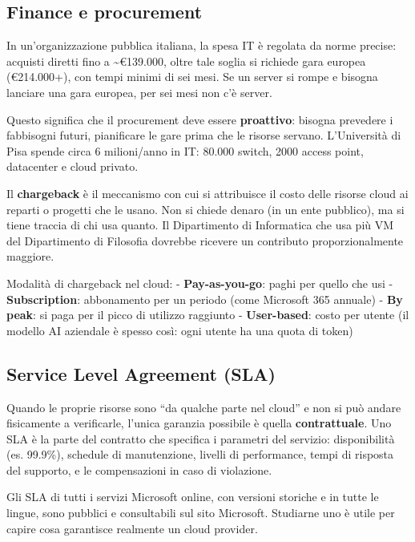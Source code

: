 \documentclass[
  italian,
  openany]{book}
\begin{document}
\subsection{Finance e procurement}\label{finance-e-procurement}

In un'organizzazione pubblica italiana, la spesa IT è regolata da norme
precise: acquisti diretti fino a \textasciitilde€139.000, oltre tale
soglia si richiede gara europea (€214.000+), con tempi minimi di sei
mesi. Se un server si rompe e bisogna lanciare una gara europea, per sei
mesi non c'è server.

Questo significa che il procurement deve essere \textbf{proattivo}:
bisogna prevedere i fabbisogni futuri, pianificare le gare prima che le
risorse servano. L'Università di Pisa spende circa 6 milioni/anno in IT:
80.000 switch, 2000 access point, datacenter e cloud privato.

Il \textbf{chargeback} è il meccanismo con cui si attribuisce il costo
delle risorse cloud ai reparti o progetti che le usano. Non si chiede
denaro (in un ente pubblico), ma si tiene traccia di chi usa quanto. Il
Dipartimento di Informatica che usa più VM del Dipartimento di Filosofia
dovrebbe ricevere un contributo proporzionalmente maggiore.

Modalità di chargeback nel cloud: - \textbf{Pay-as-you-go}: paghi per
quello che usi - \textbf{Subscription}: abbonamento per un periodo (come
Microsoft 365 annuale) - \textbf{By peak}: si paga per il picco di
utilizzo raggiunto - \textbf{User-based}: costo per utente (il modello
AI aziendale è spesso così: ogni utente ha una quota di token)

\subsection{Service Level Agreement
(SLA)}\label{service-level-agreement-sla}

Quando le proprie risorse sono ``da qualche parte nel cloud'' e non si
può andare fisicamente a verificarle, l'unica garanzia possibile è
quella \textbf{contrattuale}. Uno SLA è la parte del contratto che
specifica i parametri del servizio: disponibilità (es. 99.9\%), schedule
di manutenzione, livelli di performance, tempi di risposta del supporto,
e le compensazioni in caso di violazione.

Gli SLA di tutti i servizi Microsoft online, con versioni storiche e in
tutte le lingue, sono pubblici e consultabili sul sito Microsoft.
Studiarne uno è utile per capire cosa garantisce realmente un cloud
provider.
\end{document}
